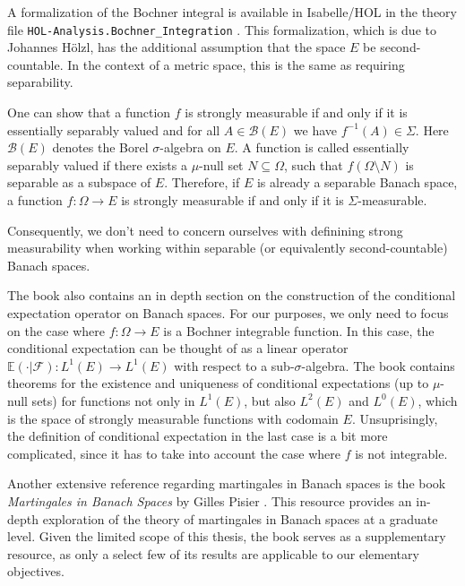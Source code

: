 A formalization of the Bochner integral is available in Isabelle/HOL in the theory file \texttt{HOL-Analysis.Bochner\_Integration} \cite{hoelzl2011measuretheory}. This formalization, which is due to Johannes Hölzl, has the additional assumption that the space $E$ be second-countable. In the context of a metric space, this is the same as requiring separability.
\vspace{0.3cm}
\begin{remark}

One can show that a function $f$ is strongly measurable if and only if it is essentially separably valued and for all $A \in \mathcal{B}(E)$ we have $f^{-1}(A) \in \Sigma$. Here $\mathcal{B}(E)$ denotes the Borel $\sigma$-algebra on $E$. A function is called essentially separably valued if there exists a $\mu$-null set $N \subseteq \Omega$, such that $f (\Omega \setminus N)$ is separable as a subspace of $E$. Therefore, if $E$ is already a separable Banach space, a function $f : \Omega \rightarrow E$ is strongly measurable if and only if it is $\Sigma$-measurable.

Consequently, we don't need to concern ourselves with definining strong measurability when working within separable (or equivalently second-countable) Banach spaces.
\end{remark}
\vspace{0.3cm}

The book also contains an in depth section on the construction of the conditional expectation operator on Banach spaces. For our purposes, we only need to focus on the case where $f : \Omega \rightarrow E$ is a Bochner integrable function. In this case, the conditional expectation can be thought of as a linear operator $\mathbb{E}(\cdot\vert\mathcal{F}) : L^1(E) \rightarrow L^1(E)$ with respect to a sub-$\sigma$-algebra. The book contains theorems for the existence and uniqueness of conditional expectations (up to $\mu$-null sets) for functions not only in $L^1(E)$, but also $L^2(E)$ and $L^0(E)$, which is the space of strongly measurable functions with codomain $E$. Unsuprisingly, the definition of conditional expectation in the last case is a bit more complicated, since it has to take into account the case where $f$ is not integrable.

Another extensive reference regarding martingales in Banach spaces is the book \textit{Martingales in Banach Spaces} by Gilles Pisier \cite{pisier_2016}. This resource provides an in-depth exploration of the theory of martingales in Banach spaces at a graduate level. Given the limited scope of this thesis, the book serves as a supplementary resource, as only a select few of its results are applicable to our elementary objectives.
